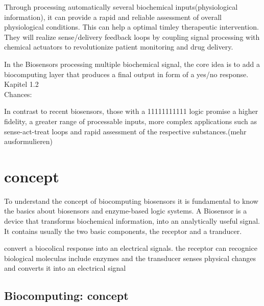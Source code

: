 \documentclass[runningheads]{llncs}
\begin{document}
	Through processing automatically several biochemical inputs(physiological information), it can provide a rapid and reliable assessment of overall physiological conditions. This can help a optimal timley therapeutic intervention. They will realize sense/delivery feedback loops by coupling signal processing with chemical actuators to revolutionize patient monitoring and drug delivery. 
	
	In the Biosensors processing multiple biochemical signal, the core idea is to add a biocomputing layer that produces a final output in form of a yes/no response. Kapitel 1.2\\
	
	Chances:
	
	
	
	
	In contrast to recent biosensors, those with a 11111111111 logic promise a higher fidelity, a greater range of processable inputs, more complex applications such as sense-act-treat loops and rapid assessment of the respective substances.(mehr ausformulieren)
	



\section{concept}

To understand the concept of biocomputing biosensors it is fundamental to know the basics about biosensors and enzyme-based logic systems. 
	A Biosensor is a device that transforms biochemical information, into an analytically useful signal. It contains usually the two basic components, the receptor and a tranducer. 
	
	convert a biocolical response into an electrical signals. the receptor can recognice biological moleculas include enzymes and the transducer senses physical changes and converts it into an electrical signal
		
		

\subsection{Biocomputing: concept}
	
\end{document}
